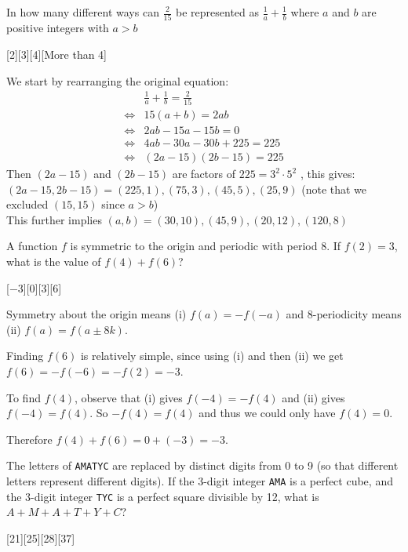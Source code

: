 \begin{problem}
    In how many different ways can $\frac{2}{15}$ be represented as $\frac{1}{a}+\frac{1}{b}$ where $a$ and $b$ are positive integers with $a>b$
\end{problem}
[2][3][4][More than 4]

\begin{solution}[D]
    We start by rearranging the original equation:
    \begin{align*}
        &\frac{1}{a}+\frac{1}{b}=\frac{2}{15}\\
        \iff &15(a+b)=2ab\\
        \iff &2ab-15a-15b=0\\
        \iff &4ab-30a-30b+225=225\\
        \iff &(2a-15)(2b-15)=225
    \end{align*}
    Then $(2a-15)$ and $(2b-15)$ are factors of $225=3^2 \cdot5^2$ , this gives:\\
    $(2a-15,2b-15) = (225,1),(75,3),(45,5),(25,9)$ (note that we excluded $(15,15)$ since $a>b$)\\
    This further implies $(a,b) = (30,10),(45,9),(20,12),(120,8)$
\end{solution}

\begin{problem}
    A function $f$ is symmetric to the origin and periodic with period 8. If $f(2) = 3$, what is the value of $f(4) + f(6)$?
\end{problem}
[$-3$][$0$][$3$][$6$]

\begin{solution}[B]
    Symmetry about the origin means (i) $f(a)=-f(-a)$ and 8-periodicity means (ii) $f(a)=f(a\pm8k)$. 

    Finding $f(6)$ is relatively simple, since using (i) and then (ii) we get $f(6) = -f(-6) = -f(2) = -3$.

    To find $f(4)$, observe that (i) gives $f(-4) = -f(4)$ and (ii) gives $f(-4) = f(4)$. So $-f(4)=f(4)$ and thus we could only have $f(4)=0$.

    Therefore $f(4) + f(6) = 0 + (-3) = \boxed{-3}$.
\end{solution}

\begin{problem}
    The letters of \texttt{AMATYC} are replaced by distinct digits from 0 to 9 (so that different letters represent different digits). If the 3-digit integer \texttt{AMA} is a perfect cube, and the 3-digit integer \texttt{TYC} is a perfect square divisible by 12, what is \( A + M + A + T + Y + C \)?
\end{problem}
[21][25][28][37]

